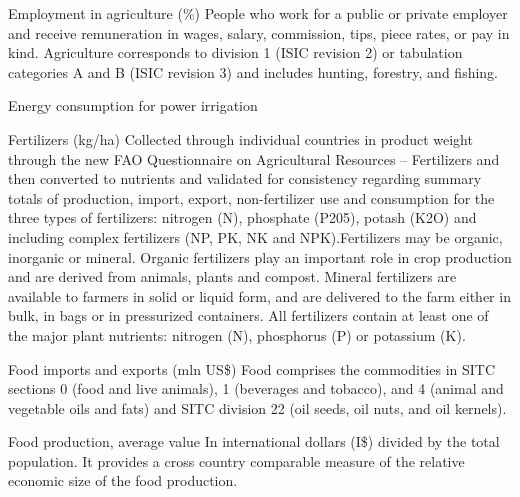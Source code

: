 \begin{MetadataCollection} {}
\begin{metadata}{Employment in agriculture (\%)} {}
People who work for a public or private employer and receive remuneration in wages, salary, commission, tips, piece rates, or pay in kind. Agriculture corresponds to division 1 (ISIC revision 2) or tabulation categories A and B (ISIC revision 3) and includes hunting, forestry, and fishing.
\end{metadata}

\begin{metadata}{Energy consumption for power irrigation} {}
\owner{ }
\end{metadata}

\begin{metadata}{Fertilizers (kg/ha)} {}
Collected through individual countries in product weight through the new FAO Questionnaire on Agricultural Resources – Fertilizers and then converted to nutrients and validated for consistency regarding summary totals of production, import, export, non-fertilizer use and consumption for the three types of fertilizers: nitrogen (N), phosphate (P205), potash (K2O) and including complex fertilizers (NP, PK, NK and NPK).Fertilizers may be organic, inorganic or mineral. Organic fertilizers play an important role in crop production and are derived from animals, plants and compost. Mineral fertilizers are available to farmers in solid or liquid form, and are delivered to the farm either in bulk, in bags or in pressurized containers. All fertilizers contain at least one of the major plant nutrients: nitrogen (N), phosphorus (P) or potassium (K).
\end{metadata}

\begin{metadata}{Food imports and exports (mln US\$)} {}
Food comprises the commodities in SITC sections 0 (food and live animals), 1 (beverages and tobacco), and 4 (animal and vegetable oils and fats) and SITC division 22 (oil seeds, oil nuts, and oil kernels).
\end{metadata}

\begin{metadata}{Food production, average value} {}
 In international dollars (I\$) divided by the total population. It provides a cross country comparable measure of the relative economic size of the food production.
\end{metadata}


\end{MetadataCollection}

